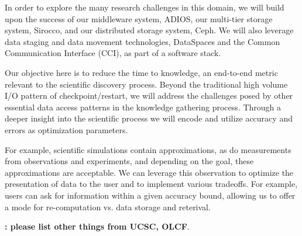 \documentclass[11pt,letterpaper]{article}
\begin{document}
In order to explore the many research challenges in this domain, we will build 
upon the success of our middleware system, ADIOS, our multi-tier storage 
system, Sirocco, and our distributed storage system, Ceph.  We will also leverage 
data staging and data movement technologies, DataSpaces and the Common 
Communication Interface (CCI), as part of a software stack. 


%

%
Our objective here is to reduce the time to knowledge, an end-to-end metric
relevant to the scientific discovery process. Beyond the traditional high
volume I/O pattern of checkpoint/restart, we will address the challenges
posed by other essential data access patterns in the knowledge gathering
process. Through a deeper insight into the scientific process we will encode
and utilize accuracy and errors as optimization parameters. 
%

For example, scientific simulations contain approximations, as do measurements 
from observations and experiments, and depending on the goal, these approximations 
are acceptable. We can leverage this observation to optimize the presentation of data
to the user and to implement various tradeoffs. For example, users can ask for information 
within a given accuracy bound, allowing us to offer a mode for re-computation vs. data storage
and reterival.

%
{\bf: please list other things from UCSC, OLCF}.
%
\end{document}
